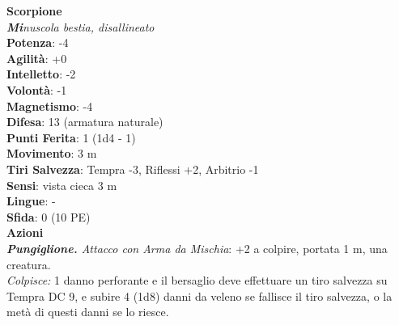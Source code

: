 \begin{multicols}{2}
\medskip\textbf{Scorpione}\\
\emph{\textbf{Mi}nuscola bestia, disallineato}\\
\textbf{Potenza}: -4\\
\textbf{Agilità}: +0\\
\textbf{Intelletto}: -2\\
\textbf{Volontà}: -1\\
\textbf{Magnetismo}: -4\\
\textbf{Difesa}: 13 (armatura naturale)\\
\textbf{Punti Ferita}: 1 (1d4 - 1)\\
\textbf{Movimento}: 3 m\\
\textbf{Tiri Salvezza}: Tempra -3, Riflessi +2, Arbitrio -1\\
\textbf{Sensi}: vista cieca 3 m\\
\textbf{Lingue}: -\\
\textbf{Sfida}: 0 (10 PE)\smallskip\\
\smallskip\textbf{Azioni}\\
\emph{\textbf{Pungiglione.} Attacco con Arma da Mischia}: +2 a colpire, portata 1 m, una creatura.\\
\emph{Colpisce:} 1 danno perforante e il bersaglio deve effettuare un tiro salvezza su Tempra DC 9, e subire 4 (1d8) danni da veleno se fallisce il tiro salvezza, o la metà di questi danni se lo riesce.\\


\end{multicols}
